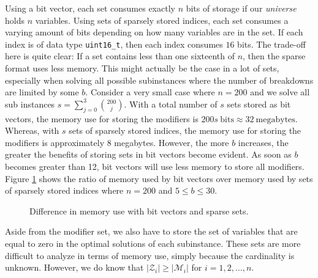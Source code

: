 Using a bit vector, each set consumes exactly $n$ bits of storage if our
\emph{universe} holds $n$ variables.
Using sets of sparsely stored indices, each set consumes a varying amount of
bits depending on how many variables are in the set. If each index is of data
type \texttt{uint16\_t}, then each index consumes $16$ bits. The trade-off
here is quite clear: If a set contains less than one sixteenth of $n$, then
the sparse format uses less memory. This might actually be the case in a lot
of sets, especially when solving all possible subinstances where the number
of breakdowns are limited by some $b$. Consider a very small case where
$n = 200$ and we solve all sub instances $s = \sum_{j=0}^{3} {200 \choose j}$.
With a total number of $s$ sets stored as bit vectors, the memory use for
storing the modifiers is $200s~\textrm{bits} \approx 32~\textrm{megabytes}$.
Whereas, with $s$ sets of sparsely stored indices, the memory use for storing
the modifiers is approximately $8$ megabytes. However, the more $b$ increases,
the greater the benefits of storing sets in bit vectors become evident. As soon
as $b$ becomes greater than 12, bit vectors will use less memory to store all
modifiers. Figure \ref{fig:bmem} shows the ratio of memory used by bit vectors
over memory used by sets of sparsely stored indices where $n = 200$ and
$5 \leq b \leq 30$.
\begin{figure}[h!]
\begin{center}

\end{center}
\caption{Difference in memory use with bit vectors and sparse sets.}
\label{fig:bmem}
\end{figure}
Aside from the modifier set, we also have to store the set of variables that
are equal to zero in the optimal solutions of each subinstance. These sets
are more difficult to analyze in terms of memory use, simply because the
cardinality is unknown. However, we do know that $|\mathcal{Z}_i| \geq
|\mathcal{M}_i|$ for $i=1,2,\ldots,n$.

